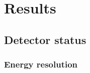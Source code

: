 \chapter{Results}
\label{ch:results}






\section{Detector status}
\label{sec:detectorstatus}


\subsection{Energy resolution}
\label{results:resolution}